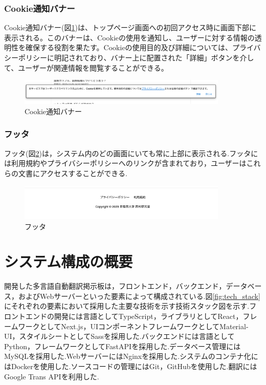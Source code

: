 \documentclass[b5paper,12pt,dvipdfmx]{jsreport}
\begin{document}
\subsubsection{Cookie通知バナー}
Cookie通知バナー(図\ref{fig:cookie_banner})は、トップページ画面への初回アクセス時に画面下部に表示される。このバナーは、Cookieの使用を通知し、ユーザーに対する情報の透明性を確保する役割を果たす。Cookieの使用目的及び詳細については、プライバシーポリシーに明記されており、バナー上に配置された「詳細」ボタンを介して、ユーザーが関連情報を閲覧することができる。

\begin{figure}[H]
	\centering
    \includegraphics[width=100mm,height=12.45mm]{./img/feature/cookie_banner.png}
	\caption{Cookie通知バナー}
	\label{fig:cookie_banner}
\end{figure}


\subsubsection{フッタ}
フッタ(図\ref{fig:footer})は，システム内のどの画面にいても常に上部に表示される.フッタには利用規約やプライバシーポリシーへのリンクが含まれており，ユーザーはこれらの文書にアクセスすることができる.

\begin{figure}[H]
	\centering
    \includegraphics[width=100mm,height=17.33mm]{./img/feature/footer.png}
	\caption{フッタ}
	\label{fig:footer}
\end{figure}




\section{システム構成の概要}
開発した多言語自動翻訳掲示板は，フロントエンド，バックエンド，データベース，およびWebサーバーといった要素によって構成されている.図\ref{fig:tech_stack}にそれぞれの要素において採用した主要な技術を示す技術スタック図を示す.フロントエンドの開発には言語としてTypeScript，ライブラリとしてReact，フレームワークとしてNext.js，UIコンポーネントフレームワークとしてMaterial-UI，スタイルシートとしてSassを採用した.バックエンドには言語としてPython，フレームワークとしてFastAPIを採用した.データベース管理にはMySQLを採用した.WebサーバーにはNginxを採用した.システムのコンテナ化にはDockerを使用した.ソースコードの管理にはGit，GitHubを使用した.翻訳にはGoogle Trans APIを利用した.
\end{document}
